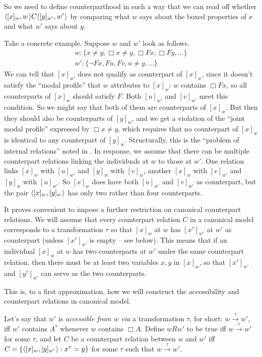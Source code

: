 \documentclass[11pt]{woarticle}
\theoremstyle{break}
\theoremstyle{nonumberplain}
\newcommand{\1}{\;\,|\;\,}
\renewcommand{\t}[1]{\ensuremath{\langle #1  \makebox[.2ex]{}\rangle}}
\begin{document}
So we need to define counterparthood in such a way that we can read off whether
$\t{[x]_w,w}C\t{[y]_{w'},w'}$ by comparing what $w$ says about the boxed
properties of $x$ and what $w'$ says about $y$.

Take a concrete example. Suppose $w$ and $w'$ look as follows.
\begin{gather*}
w: \{ x\!\not=\!y, \Box x\!\not=\!y, \Box Fx, \Box Fy, \ldots\}\\
w': \{ \neg Fx, Fu, Fv, u\!\not=\!y, \ldots\}
\end{gather*}
We can tell that $[x]_{w'}$ does not qualify as counterpart of $[x]_w$, since it
doesn't satisfy the ``modal profile'' that $w$ attributes to $[x]_w$: $w$
contains $\Box Fx$, so all counterparts of $[x]_w$ should satisfy $F$. Both
$[u]_{w'}$ and $[v]_{w'}$ meet this condition. So we might say that both of them
are counterparts of $[x]_w$. But then they should also be counterparts of
$[y]_w$, and we get a violation of the ``joint modal profile'' expressed by
$\Box x\!\not=\!y$, which requires that no counterpart of $[x]_w$ is identical
to any counterpart of $[y]_w$. Structurally, this is the ``problem of internal
relations'' noted in \cite{hazen79counterpart}. In response, we assume that
there can be multiple counterpart relations linking the individuals at $w$ to
those at $w'$. One relation links $[x]_w$ with $[u]_{w'}$ and $[y]_{w}$ with
$[v]_w$, another $[x]_w$ with $[v]_{w'}$ and $[y]_{w}$ with $[u]_{w'}$. So
$[x]_w$ does have both $[u]_{w'}$ and $[v]_{w'}$ as counterpart, but the pair
$\t{[x]_w,[y]_w}$ has only two rather than four counterparts.

It proves convenient to impose a further restriction on canonical counterpart
relations. We will assume that every counterpart relation $C$ in a canonical
model corresponds to a transformation $\tau$ so that $[x]_w$ at $w$ has
$[x^\tau]_{w'}$ at $w'$ as counterpart (unless $[x^\tau]_{w'}$ is empty -- see
below). This means that if an individual $[x]_w$ at $w$ has two counterparts at
$w'$ under the same counterpart relation, then there must be at least two
variables $x,y$ in $[x]_w$, so that $[x^\tau]_{w'}$ and $[y^\tau]_{w'}$ can
serve as the two counterparts.

This is, to a first approximation, how we will construct the accessibility and
counterpart relations in canonical model.

Let's say that $w'$ is \emph{accessible from $w$ via} a transformation $\tau$,
for short: $w \xrightarrow{\tau} w'$, iff $w'$ contains $A^\tau$ whenever $w$
contains $\Box A$. Define $wRw'$ to be true iff $w\xrightarrow{\tau} w'$ for
some $\tau$, and let $C$ be a counterpart relation between $w$ and $w'$ iff
$C = \{ \t{[x]_w, [y]_{w'}} : x^\tau = y \}$ for some $\tau$ such that
$w \xrightarrow{\tau} w'$.
\end{document}
